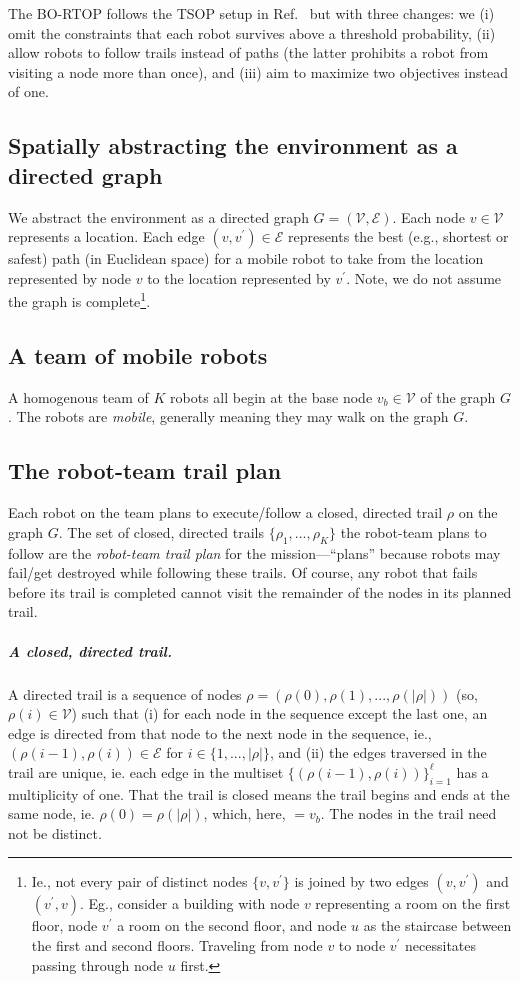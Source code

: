 \documentclass[11pt, oneside]{article}
\begin{document}
The BO-RTOP follows the TSOP setup in Ref.~\cite{jorgensen2018team} but with three changes: we (i) omit the constraints that each robot survives above a threshold probability, (ii) allow robots to follow trails instead of paths (the latter prohibits a robot from visiting a node more than once), and (iii) aim to maximize two objectives instead of one.

\subsection{Spatially abstracting the environment as a directed graph}
We abstract the environment as a directed graph $G=(\mathcal{V}, \mathcal{E})$. Each node $v\in \mathcal{V}$ represents a location. Each edge $(v, v^\prime) \in \mathcal{E}$ represents the best (e.g., shortest or safest) path (in Euclidean space) for a mobile robot to take from the location represented by node $v$ to the location represented by $v^\prime$.
Note, we do not assume the graph is complete\footnote{Ie., not every pair of distinct nodes $\{v, v^\prime\}$ is joined by two edges $(v, v^\prime)$ and $(v^\prime, v)$. 
Eg., consider a building with node $v$ representing a room on the first floor, node $v^\prime$ a room on the second floor, and node $u$ as the staircase between the first and second floors. Traveling from node $v$ to node $v^\prime$ necessitates passing through node $u$ first.}.

\subsection{A team of mobile robots}
A homogenous team of $K$ robots all begin at the base node $v_b \in \mathcal{V}$ of the graph $G$. The robots are \emph{mobile}, generally meaning they may walk on the graph $G$.

\subsection{The robot-team trail plan}
Each robot on the team plans to execute/follow a closed, directed trail $\rho$ on the graph $G$.  
The set of closed, directed trails $\{\rho_1, ..., \rho_K\}$ the robot-team plans to follow are the \emph{robot-team trail plan} for the mission---``plans'' because robots may fail/get destroyed while following these trails. 
Of course, any robot that fails before its trail is completed cannot visit the remainder of the nodes in its planned trail.

\subparagraph{A closed, directed trail.} A directed trail is a sequence of nodes $\rho=(\rho(0), \rho(1), ..., \rho(\lvert \rho \rvert))$ (so, $\rho(i) \in \mathcal{V}$) such that 
(i) for each node in the sequence except the last one, an edge is directed from that node to the next node in the sequence, ie., $(\rho(i-1), \rho(i))\in\mathcal{E}$ for $i \in \{1, ..., \lvert \rho \rvert \}$,
and 
(ii) the edges traversed in the trail are unique, ie. each edge in the multiset $\{(\rho(i-1), \rho(i))\}_{i=1}^{\ell}$ has a multiplicity of one.
That the trail is closed means the trail begins and ends at the same node, ie. $\rho(0)=\rho(\lvert \rho \rvert)$, which, here, $=v_b$.
The nodes in the trail need not be distinct.
\end{document}

